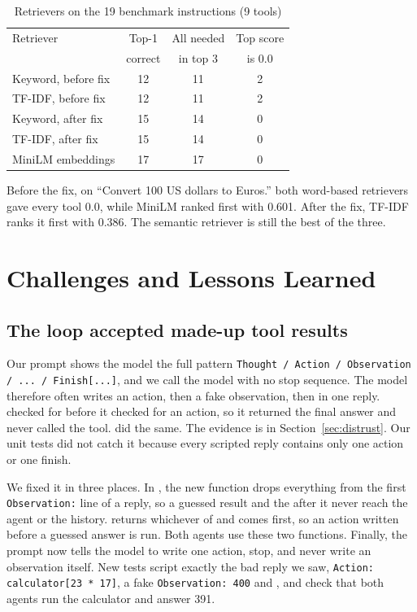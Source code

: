 \documentclass[conference,a4paper]{IEEEtran}
\begin{document}
\begin{table}[t]
  \centering
  \caption{Retrievers on the 19 benchmark instructions (9 tools)}
  \label{tab:ret}
  \small
  \setlength{\tabcolsep}{4pt}
  \begin{tabular}{lccc}
    \toprule
    Retriever & Top-1 & All needed & Top score \\
              & correct & in top 3 & is 0.0 \\
    \midrule
    Keyword, before fix & 12 & 11 & 2 \\
    TF-IDF, before fix  & 12 & 11 & 2 \\
    Keyword, after fix  & 15 & 14 & 0 \\
    TF-IDF, after fix   & 15 & 14 & 0 \\
    MiniLM embeddings   & 17 & 17 & 0 \\
    \bottomrule
  \end{tabular}
\end{table}

Before the fix, on ``Convert 100 US dollars to Euros.'' both word-based
retrievers gave every tool 0.0, while MiniLM ranked
 first with 0.601. After the fix, TF-IDF ranks
it first with 0.386. The semantic retriever is still the best of the
three.

\section{Challenges and Lessons Learned}

\subsection{The loop accepted made-up tool results}\label{sec:fake-obs}
Our prompt shows the model the full pattern \texttt{Thought / Action /
Observation / ... / Finish[...]}, and we call the model with no stop
sequence. The model therefore often writes an action, then a fake
observation, then  in one reply. 
checked for  before it checked for an action, so it returned
the final answer and never called the tool.  did the same.
The evidence is in Section~\ref{sec:distrust}. Our unit tests did not catch it because
every scripted  reply contains only one action or one
finish.

We fixed it in three places. In , the new function
 drops everything from the first
\texttt{Observation:} line of a reply, so a guessed result and the
 after it never reach the agent or the history.
 returns whichever of  and 
comes first, so an action written before a guessed answer is run. Both
agents use these two functions. Finally, the prompt now tells the model
to write one action, stop, and never write an observation itself. New
tests script exactly the bad reply we saw, \texttt{Action:
calculator[23 * 17]}, a fake \texttt{Observation: 400} and
, and check that both agents run the calculator and
answer 391.
\end{document}
